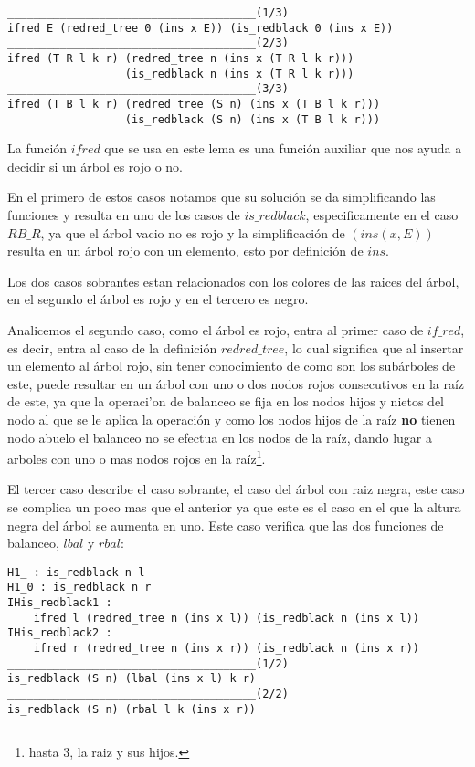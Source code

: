  \begin{verbatim}
______________________________________(1/3)
ifred E (redred_tree 0 (ins x E)) (is_redblack 0 (ins x E))
______________________________________(2/3)
ifred (T R l k r) (redred_tree n (ins x (T R l k r)))
                  (is_redblack n (ins x (T R l k r)))
______________________________________(3/3)
ifred (T B l k r) (redred_tree (S n) (ins x (T B l k r)))
                  (is_redblack (S n) (ins x (T B l k r)))
 \end{verbatim}

La funci\'on $ifred$ que se usa en este lema es una funci\'on auxiliar que nos ayuda a decidir si
un \'arbol es rojo o no.

En el primero de estos casos notamos que su soluci\'on se da simplificando las funciones y resulta
en uno de los casos de $is\_redblack$, especificamente en el caso $RB\_R$, ya que el \'arbol vacio
no es rojo y la simplificaci\'on de $(ins(x,E))$ resulta en un \'arbol rojo con un elemento, esto
por definici\'on de $ins$.

Los dos casos sobrantes estan relacionados con los colores de las raices del \'arbol, en el
segundo el \'arbol es rojo y en el tercero es negro.

Analicemos el segundo caso, como el \'arbol es rojo, entra al primer caso de $if\_red$, es decir,
entra al caso de la definici\'on $redred\_tree$, lo cual significa que al insertar un elemento al
\'arbol rojo, sin tener conocimiento de como son los subárboles de este, puede resultar en un
\'arbol con uno o dos nodos rojos consecutivos en la ra\'iz de este, ya que la operaci'on de
balanceo se fija en los nodos hijos y nietos del nodo al que se le aplica la operaci\'on y como
los nodos hijos de la raíz \textbf{no} tienen nodo abuelo el balanceo no se efectua en los nodos
de la raíz, dando lugar a arboles con uno o mas nodos rojos en la raíz\footnote{hasta 3, la raiz y
sus hijos.}.

El tercer caso describe el caso sobrante, el caso del \'arbol con raiz negra, este caso se
complica un poco mas que el anterior ya que este es el caso en el que la altura negra del \'arbol
se aumenta en uno. Este caso verifica que las dos funciones de balanceo, $lbal$ y $rbal$:

\begin{verbatim}
H1_ : is_redblack n l
H1_0 : is_redblack n r
IHis_redblack1 :
    ifred l (redred_tree n (ins x l)) (is_redblack n (ins x l))
IHis_redblack2 :
    ifred r (redred_tree n (ins x r)) (is_redblack n (ins x r))
______________________________________(1/2)
is_redblack (S n) (lbal (ins x l) k r)
______________________________________(2/2)
is_redblack (S n) (rbal l k (ins x r))
\end{verbatim}

